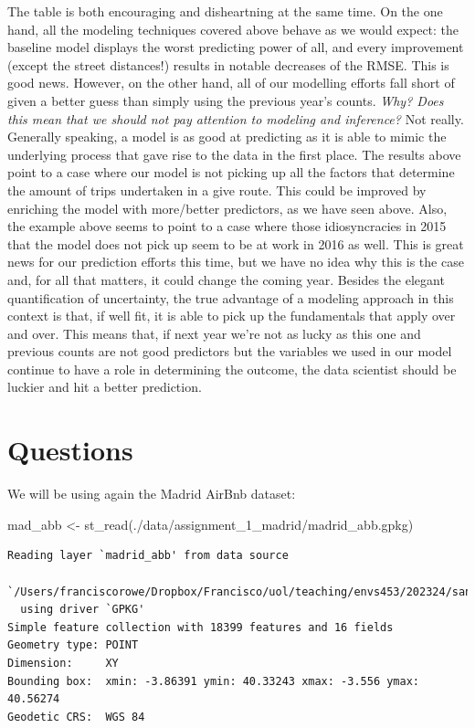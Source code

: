 \documentclass[
  letterpaper,
  DIV=11,
  numbers=noendperiod,
  oneside]{scrreprt}
\newenvironment{Shaded}{\begin{snugshade}}{\end{snugshade}}
\newcommand{\FunctionTok}[1]{\textcolor[rgb]{0.28,0.35,0.67}{#1}}
\newcommand{\NormalTok}[1]{\textcolor[rgb]{0.00,0.23,0.31}{#1}}
\newcommand{\OtherTok}[1]{\textcolor[rgb]{0.00,0.23,0.31}{#1}}
\newcommand{\StringTok}[1]{\textcolor[rgb]{0.13,0.47,0.30}{#1}}
\begin{document}
The table is both encouraging and disheartning at the same time. On the
one hand, all the modeling techniques covered above behave as we would
expect: the baseline model displays the worst predicting power of all,
and every improvement (except the street distances!) results in notable
decreases of the RMSE. This is good news. However, on the other hand,
all of our modelling efforts fall short of given a better guess than
simply using the previous year's counts. \emph{Why? Does this mean that
we should not pay attention to modeling and inference?} Not really.
Generally speaking, a model is as good at predicting as it is able to
mimic the underlying process that gave rise to the data in the first
place. The results above point to a case where our model is not picking
up all the factors that determine the amount of trips undertaken in a
give route. This could be improved by enriching the model with
more/better predictors, as we have seen above. Also, the example above
seems to point to a case where those idiosyncracies in 2015 that the
model does not pick up seem to be at work in 2016 as well. This is great
news for our prediction efforts this time, but we have no idea why this
is the case and, for all that matters, it could change the coming year.
Besides the elegant quantification of uncertainty, the true advantage of
a modeling approach in this context is that, if well fit, it is able to
pick up the fundamentals that apply over and over. This means that, if
next year we're not as lucky as this one and previous counts are not
good predictors but the variables we used in our model continue to have
a role in determining the outcome, the data scientist should be luckier
and hit a better prediction.

\section{Questions}\label{questions-1}

We will be using again the Madrid AirBnb dataset:

\begin{Shaded}
\begin{Highlighting}[]
\NormalTok{mad\_abb }\OtherTok{\textless{}{-}} \FunctionTok{st\_read}\NormalTok{(}\StringTok{\textquotesingle{}./data/assignment\_1\_madrid/madrid\_abb.gpkg\textquotesingle{}}\NormalTok{)}
\end{Highlighting}
\end{Shaded}

\begin{verbatim}
Reading layer `madrid_abb' from data source 
  `/Users/franciscorowe/Dropbox/Francisco/uol/teaching/envs453/202324/san/data/assignment_1_madrid/madrid_abb.gpkg' 
  using driver `GPKG'
Simple feature collection with 18399 features and 16 fields
Geometry type: POINT
Dimension:     XY
Bounding box:  xmin: -3.86391 ymin: 40.33243 xmax: -3.556 ymax: 40.56274
Geodetic CRS:  WGS 84
\end{verbatim}
\end{document}
